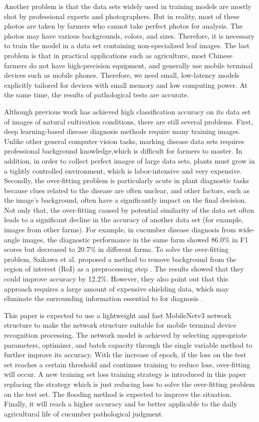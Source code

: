\documentclass[a4paper,fleqn]{cas-sc}
\begin{document}
Another problem is that the data sets widely used in training models are mostly shot by professional experts and photographers. But in reality, most of these photos are taken by farmers who cannot take perfect photos for analysis. The photos may have various backgrounds, colors, and sizes. Therefore, it is necessary to train the model in a data set containing non-specialized leaf images. The last problem is that in practical applications such as agriculture, most Chinese farmers do not have high-precision equipment, and generally use mobile terminal devices such as mobile phones. Therefore, we need small, low-latency models explicitly tailored for devices with small memory and low computing power. At the same time, the results of pathological tests are accurate. 

Although previous work has achieved high classification accuracy on its data set of images of natural cultivation conditions, there are still several problems. First, deep learning-based disease diagnosis methods require many training images. Unlike other general computer vision tasks, marking disease data sets requires professional background knowledge,which is difficult for farmers to master. In addition, in order to collect perfect images of large data sets, plants must grow in a tightly controlled environment, which is labor-intensive and very expensive. Secondly, the over-fitting problem is particularly acute in plant diagnostic tasks because clues related to the disease are often unclear, and other factors, such as the image's background, often have a significantly impact on the final decision. Not only that, the over-fitting caused by potential similarity of the data set often leads to a significant decline in the accuracy of another data set (for example, images from other farms). For example, in cucumber disease diagnosis from wide-angle images, the diagnostic performance in the same farm showed 86.0\% in F1 scores but decreased to 20.7\% in different farms. To solve the over-fitting problem, Saikawa et al. proposed a method to remove background from the region of interest (RoI) as a preprocessing step \citep{saikawa2019aop} . The results showed that they could improve accuracy by 12.2\%. However, they also point out that this approach requires a large amount of expensive shielding data, which may eliminate the surrounding information essential to for diagnosis \citep{cap2020leafgan}. 

This paper is expected to use a lightweight and fast MobileNetv3 network structure to make the network structure suitable for mobile terminal device recognition processing. The network model is achieved by selecting appropriate parameters, optimizer, and batch capacity through the single variable method to further improve its accuracy. With the increase of epoch, if the loss on the test set reaches a certain threshold and continues training to reduce loss, over-fitting will occur. A new training set loss training strategy is introduced in this paper replacing the strategy which is just reducing loss to solve the over-fitting problem on the test set. The flooding method is expected to improve the situation. Finally, it will reach a higher accuracy and be better applicable to the daily agricultural life of cucumber pathological judgment.
\end{document}

